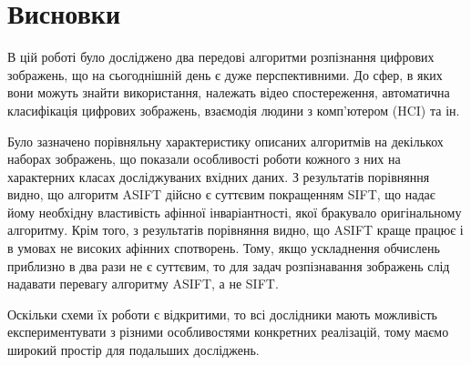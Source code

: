 \chapter{Висновки}

В цій роботі було досліджено два передові алгоритми розпізнання цифрових зображень, що на сьогоднішній день є дуже перспективними. До сфер, в яких вони можуть знайти використання, належать відео спостереження, автоматична класифікація цифрових зображень, взаємодія людини з комп'ютером (HCI) та ін. 

Було зазначено порівняльну характеристику описаних алгоритмів на декількох наборах зображень, що показали особливості роботи кожного з них на характерних класах досліджуваних вхідних даних. З результатів порівняння видно, що алгоритм ASIFT дійсно є суттєвим покращенням SIFT, що надає йому необхідну властивість афінної інваріантності, якої бракувало оригінальному алгоритму. Крім того, з результатів порівняння видно, що ASIFT краще працює і в умовах не високих афінних спотворень. Тому, якщо ускладнення обчислень приблизно в два рази не є суттєвим, то для задач розпізнавання зображень слід надавати перевагу алгоритму ASIFT, а не SIFT.

Оскільки схеми їх роботи є відкритими, то всі дослідники мають можливість експериментувати з різними особливостями конкретних реалізацій, тому маємо широкий простір для подальших досліджень.
